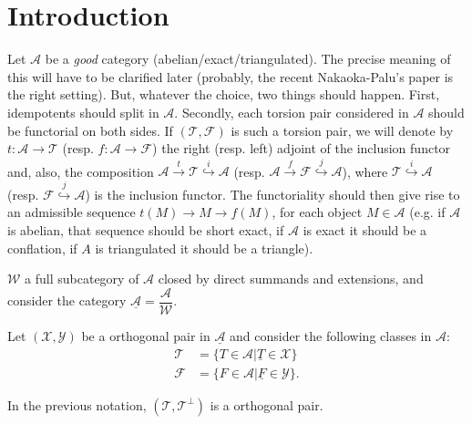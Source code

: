 \section{Introduction}

Let $\mathcal{A}$ be a \emph{good} category
(abelian/exact/triangulated). The precise meaning of this will have to
be clarified later (probably, the recent Nakaoka-Palu's paper is the
right setting). But, whatever the choice, two things should happen.
First, idempotents should split in $\mathcal{A}$. Secondly,  each
torsion pair considered  in $\mathcal{A}$ should be functorial on both
sides. If $(\mathcal{T},\mathcal{F})$ is such a torsion pair, we will
denote by $t:\mathcal{A}\longrightarrow\mathcal{T}$ (resp.
$f:\mathcal{A}\longrightarrow\mathcal{F}$) the right (resp. left)
adjoint of the inclusion functor and, also, the composition
$\mathcal{A}\stackrel{t}{\longrightarrow}\mathcal{T}\stackrel{i}{\hookrightarrow}\mathcal{A}$
(resp.
$\mathcal{A}\stackrel{f}{\longrightarrow}\mathcal{F}\stackrel{j}{\hookrightarrow}\mathcal{A}$),
where $\mathcal{T}\stackrel{i}{\hookrightarrow}\mathcal{A}$ (resp.
$\mathcal{F}\stackrel{j}{\hookrightarrow}\mathcal{A}$) is the inclusion
functor. The functoriality should then give rise to an admissible
sequence $t(M)\longrightarrow M\longrightarrow f(M)$, for each object
$M\in\mathcal{A}$ (e.g. if $\mathcal{A}$ is abelian, that sequence
should be short exact, if $\mathcal{A}$ is exact it should be a
conflation, if $A$ is triangulated it should be a triangle).



$\mathcal{W}$ a full subcategory of $\mathcal{A}$ closed by direct
summands and extensions, and consider the category
$\underline{\mathcal{A}}=\dfrac{\mathcal{A}}{\mathcal{W}}$.

Let $(\mathcal{X},\mathcal{Y})$ be a orthogonal pair in
$\underline{\mathcal{A}}$ and consider the following classes in
$\mathcal{A}$:
\begin{align*}
  \mathcal{T} &= \{ T\in\mathcal{A} | \underline{T}\in\mathcal{X} \} \\
  \mathcal{F} &= \{ F\in\mathcal{A} | \underline{F}\in\mathcal{Y} \}.
\end{align*}

\begin{lemma}
  In the previous notation, $(\mathcal{T}, \mathcal{T}^\perp)$ is a
orthogonal pair.
\end{lemma}

